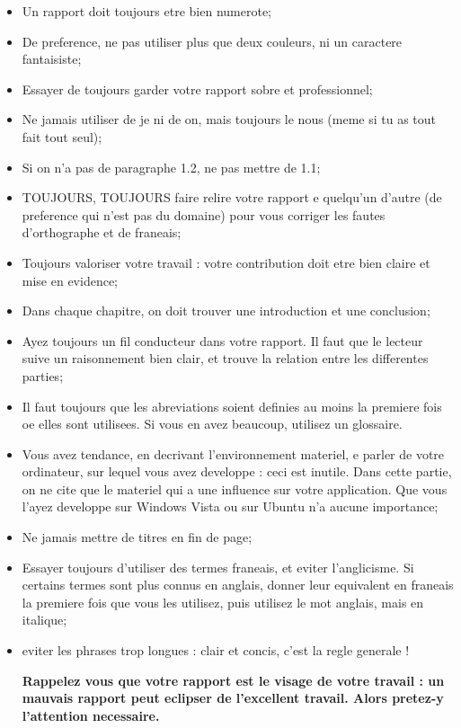 \begin{itemize}
\item Un rapport doit toujours etre bien numerote;
\item De preference, ne pas utiliser plus que deux couleurs, ni un caractere fantaisiste; 
\item Essayer de toujours garder votre rapport sobre et professionnel; 
\item Ne jamais utiliser de je ni de on, mais toujours le nous (meme si tu as tout fait tout seul); 
\item Si on n'a pas de paragraphe 1.2, ne pas mettre de 1.1;
\item TOUJOURS, TOUJOURS faire relire votre rapport e quelqu'un d'autre (de preference qui n'est pas du domaine) pour vous corriger les fautes d'orthographe et de franeais;
\item Toujours valoriser votre travail : votre contribution doit etre bien claire et mise en evidence; 
\item Dans chaque chapitre, on doit trouver une introduction et une conclusion;
\item Ayez toujours un fil conducteur dans votre rapport. Il faut que le lecteur suive un raisonnement bien clair, et trouve la relation entre les differentes parties;
\item Il faut toujours que les abreviations soient definies au moins la premiere fois oe elles sont utilisees. Si vous en avez beaucoup, utilisez un glossaire.
\item Vous avez tendance, en decrivant  l'environnement materiel, e parler de votre ordinateur, sur lequel vous avez developpe : ceci est inutile. Dans cette partie, on ne cite que le materiel qui a une influence sur votre application. Que vous l'ayez developpe sur Windows Vista ou sur Ubuntu n'a aucune importance;
\item Ne jamais mettre de titres en fin de page; 
\item Essayer toujours d'utiliser des termes franeais, et eviter l'anglicisme. Si certains termes  sont plus connus en  anglais, donner leur equivalent en franeais la premiere fois que vous les utilisez, puis utilisez le mot anglais, mais en italique;
\item eviter les phrases trop longues : clair et concis, c'est la regle generale !\\

\newpage

\textbf{Rappelez vous que votre rapport est le visage de votre travail : un mauvais rapport peut eclipser de l'excellent travail. Alors pretez-y l'attention necessaire.}


\end{itemize}
